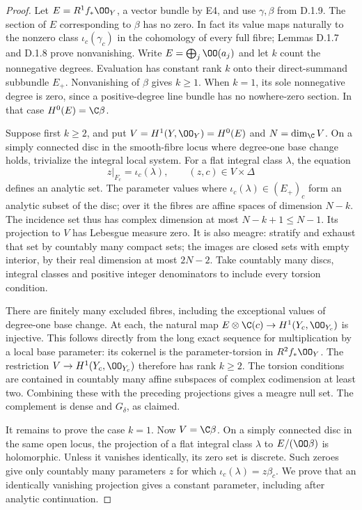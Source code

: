 \begin{proof}
Let $E=R^1f_*\OO_Y$, a vector bundle by E4, and use
$\gamma,\beta$ from D.1.9. The section of $E$ corresponding to
$\beta$ has no zero. In fact its value maps naturally to the
nonzero class $\iota_c(\gamma_c)$ in the cohomology of every full
fibre; Lemmas D.1.7 and D.1.8 prove nonvanishing. Write
$E=\bigoplus_j\OO(a_j)$ and let $k$ count the nonnegative degrees.
Evaluation has constant rank $k$ onto their direct-summand subbundle
$E_+$. Nonvanishing of $\beta$ gives $k\geq1$. When $k=1$, its
sole nonnegative degree is zero, since a positive-degree line bundle
has no nowhere-zero section. In that case $H^0(E)=\C\beta$.

Suppose first $k\geq2$, and put $V=H^1(Y,\OO_Y)=H^0(E)$ and
$N=\dim_{\C}V$. On a simply connected disc in the smooth-fibre
locus where degree-one base change holds, trivialize the integral
local system. For a flat integral
class $\lambda$, the equation
\[
z|_{F_c}=\iota_c(\lambda),\qquad (z,c)\in V\times\Delta
\]
defines an analytic set. The parameter values where
$\iota_c(\lambda)\in(E_+)_c$ form an analytic subset of the disc;
over it the fibres are affine spaces of dimension $N-k$.
The incidence set thus has complex dimension at most
$N-k+1\leq N-1$. Its projection to $V$ has Lebesgue
measure zero. It is also meagre: stratify and exhaust that set
by countably many compact sets; the images are closed sets with
empty interior, by their real dimension at most $2N-2$.
Take countably many discs, integral classes and positive integer
denominators to include every torsion condition.

There are finitely many excluded fibres, including the exceptional
values of degree-one base change. At each, the natural map
$E\otimes\C(c)\to H^1(Y_c,\OO_{Y_c})$ is injective. This follows
directly from the long exact sequence for multiplication by a local
base parameter: its cokernel is the parameter-torsion in
$R^2f_*\OO_Y$. The restriction $V\to H^1(Y_c,\OO_{Y_c})$
therefore has rank $k\geq2$. The torsion conditions are contained in
countably many affine subspaces of complex codimension at least
two. Combining these with the preceding projections gives a
meagre null set. The complement is dense and $G_\delta$, as claimed.

It remains to prove the case $k=1$.
Now $V=\C\beta$. On a simply connected disc in the same open locus,
the projection of a flat integral class $\lambda$ to
$E/(\OO\beta)$ is holomorphic. Unless it vanishes identically,
its zero set is discrete. Such zeroes give only countably many
parameters $z$ for which $\iota_c(\lambda)=z\beta_c$.
We prove that an identically vanishing projection gives a constant
parameter, including after analytic continuation.


\end{proof}
